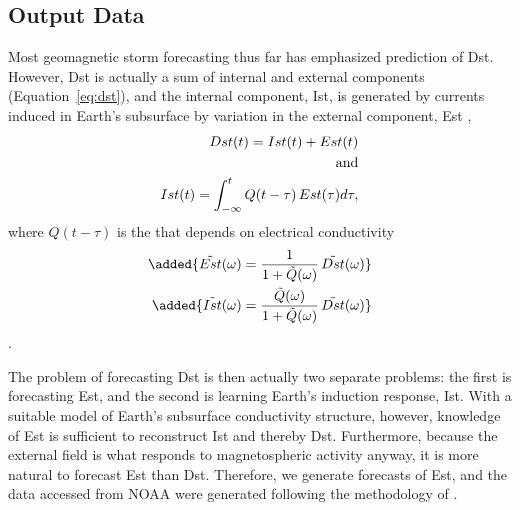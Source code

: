 \documentclass[draft,linenumbers]{agujournal2018}
\begin{document}
\subsection{Output Data}
Most geomagnetic storm forecasting thus far has emphasized prediction of Dst. However, Dst is actually a sum of internal and external components (Equation~\ref{eq:dst}), and the internal component, Ist, is generated by currents induced in Earth's subsurface by variation in the external component, Est \citep{Maus2004} ,
\begin{eqnarray}
    Dst(t) = Ist(t) + Est(t) \label{eq:dst}\\
    \textnormal{and}\nonumber \\
    Ist(t) = \int_{-\infty}^t Q(t-\tau)\,Est(\tau) d\tau \label{eq:ist},
\end{eqnarray}
where $Q(t-\tau)$ is the  that depends on  electrical conductivity \added{$\sigma$}
\begin{eqnarray}
    \added{\tilde{Est}(\omega) = \frac{1}{1+\tilde{Q}(\omega)}\,\tilde{Dst}(\omega)} \\
    \added{\tilde{Ist}(\omega) = \frac{\tilde{Q}(\omega)}{1+\tilde{Q}(\omega)}\,\tilde{Dst}(\omega)}
\end{eqnarray}
 \cite{Maus2004, Olsen2005, Grayver2020}.

The problem of forecasting Dst is then actually two separate problems: the first is forecasting Est, and the second is learning Earth's induction response, Ist. With a suitable model of Earth's subsurface conductivity structure, however, knowledge of Est is sufficient to reconstruct Ist and thereby Dst. Furthermore, because the external field is what responds to magnetospheric activity anyway, it is more natural to forecast Est than Dst. Therefore, we generate forecasts of Est, and the data accessed from NOAA were generated following the methodology of \cite{Maus2004} . 
\end{document}
